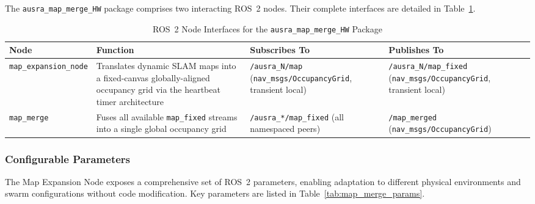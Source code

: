 The \texttt{ausra\_map\_merge\_HW} package comprises two interacting ROS~2 nodes. Their complete interfaces are detailed in Table~\ref{tab:map_merge_nodes}.

\begin{table}[H]
\centering
\small
\caption{ROS~2 Node Interfaces for the \texttt{ausra\_map\_merge\_HW} Package}
\label{tab:map_merge_nodes}
\begin{tabular}{|l|p{4cm}|p{4cm}|p{4cm}|}
\hline
\textbf{Node} & \textbf{Function} & \textbf{Subscribes To} & \textbf{Publishes To} \\
\hline
\texttt{map\_expansion\_node} & Translates dynamic SLAM maps into a fixed-canvas globally-aligned occupancy grid via the heartbeat timer architecture & \texttt{/ausra\_N/map} \newline (\texttt{nav\_msgs/OccupancyGrid}, transient local) & \texttt{/ausra\_N/map\_fixed} \newline (\texttt{nav\_msgs/OccupancyGrid}, transient local) \\
\hline
\texttt{map\_merge} & Fuses all available \texttt{map\_fixed} streams into a single global occupancy grid & \texttt{/ausra\_*/map\_fixed} \newline (all namespaced peers) & \texttt{/map\_merged} \newline (\texttt{nav\_msgs/OccupancyGrid}) \\
\hline
\end{tabular}
\end{table}

\subsubsection{Configurable Parameters}

The Map Expansion Node exposes a comprehensive set of ROS~2 parameters, enabling adaptation to different physical environments and swarm configurations without code modification. Key parameters are listed in Table~\ref{tab:map_merge_params}.

